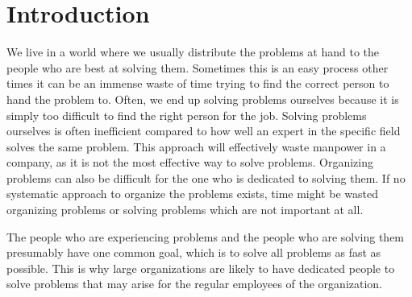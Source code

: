 \chapter{Introduction}
\label{sec:introduction}
\emptyTop{}%
\vspace{-15mm}%


We live in a world where we usually distribute the problems at hand to the people who are best at solving them.
Sometimes this is an easy process other times it can be an immense waste of time trying to find the correct person to hand the problem to.
Often, we end up solving problems ourselves because it is simply too difficult to find the right person for the job.
Solving problems ourselves is often inefficient compared to how well an expert in the specific field solves the same problem.
This approach will effectively waste manpower in a company, as it is not the most effective way to solve problems.
Organizing problems can also be difficult for the one who is dedicated to solving them.
If no systematic approach to organize the problems exists, time might be wasted organizing problems or solving problems which are not important at all.

The people who are experiencing problems and the people who are solving them presumably have one common goal, which is to solve all problems as fast as possible.
This is why large organizations are likely to have dedicated people to solve problems that may arise for the regular employees of the organization.

